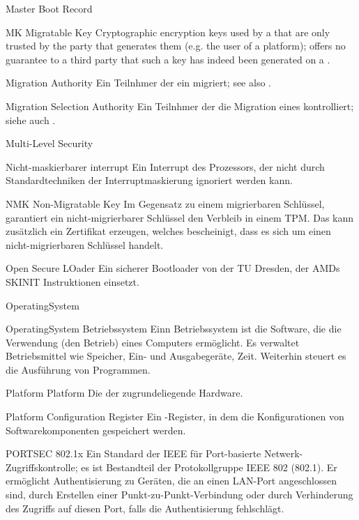 	{Master Boot Record}

\glosentry
	{MK}
	{Migratable Key}
	{Cryptographic encryption keys used by a \TPM that are only trusted by
	the party that generates them (e.g. the user of a platform); offers no
	guarantee to a third party that such a key has indeed been generated on a \TPM.}


	{Migration Authority}
	{Ein Teilnhmer der ein \CMK migriert; see also \MSA.}

	{Migration Selection Authority}
	{Ein Teilnhmer der die Migration eines \CMK kontrolliert;
	 siehe auch \MA.}

	{Multi-Level Security}

        {Nicht-maskierbarer interrupt}
        {Ein Interrupt des Prozessors, der nicht durch Standardtechniken der
         Interruptmaskierung ignoriert werden kann.}


\glosentry
	{NMK}
	{Non-Migratable Key}
	{Im Gegensatz zu einem migrierbaren Schlüssel, garantiert ein nicht-migrierbarer Schl\"ussel den Verbleib in einem TPM.
	Das \TPM kann zus\"atzlich ein Zertifikat erzeugen, welches bescheinigt, dass es sich um einen nicht-migrierbaren Schl\"ussel handelt.}

	{Open Secure LOader}
	{Ein sicherer Bootloader von der TU Dresden, der  AMDs SKINIT 
	 Instruktionen einsetzt.}

     {OperatingSystem}

\glosentry
	{OperatingSystem}
	{Betriebssystem}
	{Einn Betriebssystem ist die Software, die die Verwendung (den Betrieb)
	 eines Computers erm\"oglicht. Es verwaltet Betriebsmittel wie Speicher, 
	 Ein- und Ausgabeger\"ate, \CPU Zeit. Weiterhin steuert es die Ausf\"uhrung
	 von Programmen.}

\glosentry
	{Platform}
	{Platform}
	{Die der \TCB zugrundeliegende Hardware.}

	{Platform Configuration Register}
	{Ein \TPM-Register, in dem die Konfigurationen von Softwarekomponenten gespeichert werden.}

\glosentry
        {PORTSEC}
        {802.1x}
        {Ein Standard der IEEE f\"ur Port-basierte Netwerk-Zugriffskontrolle;
         es ist Bestandteil der Protokollgruppe IEEE 802 (802.1). Er
         erm\"oglicht Authentisierung zu Ger\"aten, die an einen LAN-Port
         angeschlossen sind, durch Erstellen einer Punkt-zu-Punkt-Verbindung
         oder durch Verhinderung des Zugriffs auf diesen Port, falls die
         Authentisierung fehlschl\"agt.}



